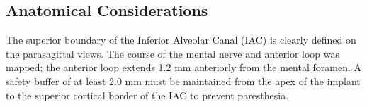 \subsection{Anatomical Considerations}
The superior boundary of the Inferior Alveolar Canal (IAC) is clearly defined on the parasagittal views. The course of the mental nerve and anterior loop was mapped; the anterior loop extends 1.2 mm anteriorly from the mental foramen. A safety buffer of at least 2.0 mm must be maintained from the apex of the implant to the superior cortical border of the IAC to prevent paresthesia.
